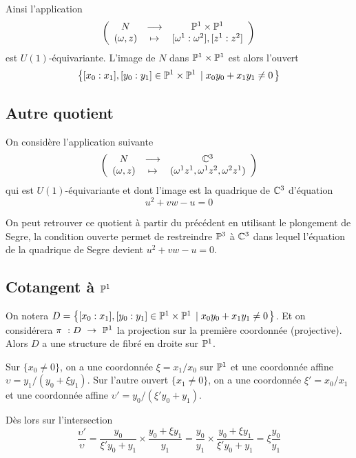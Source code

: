 \documentclass[a4paper,10pt]{article}
\begin{document}
Ainsi l'application
\[
\left(
\begin{array}{ccc}
N & \longrightarrow & \mathbb{P}^1 \times \mathbb{P}^1 \\ 
(\omega,z) & \mapsto & [\omega^1 : \omega^2],[z^1 : z^2]
\end{array} 
\right)
\]
est $U(1)$-équivariante. L'image de $N$ dans $\mathbb{P}^1 \times \mathbb{P}^1 $ est alors l'ouvert
\[
\left\lbrace {[x_0:x_1],[y_0:y_1]\in \mathbb{P}^1 \times \mathbb{P}^1  } \; \left| \; {x_0y_0 + x_1y_1 \neq 0} \right. \right\rbrace
\]
\subsection{Autre quotient}
On considère l'application suivante
\[
\left(
\begin{array}{ccc}
N & \longrightarrow & \mathbb{C}^3 \\ 
(\omega,z) & \mapsto & (\omega^1z^1, \omega^1z^2, \omega^2z^1)
\end{array} 
\right)
\]
qui est $U(1)$-équivariante et dont l'image est la quadrique de $\mathbb{C}^3$ d'équation
\[
u^2+vw-u = 0
\]

On peut retrouver ce quotient à partir du précédent en utilisant le plongement de Segre, la condition ouverte permet de restreindre $\mathbb{P}^3$ à $\mathbb{C}^3$ dans lequel l'équation de la quadrique de Segre devient $u^2+vw-u = 0$.

\subsection{Cotangent à $\mathbb{P}^1$}
On notera $D = \left\lbrace {[x_0:x_1],[y_0:y_1]\in \mathbb{P}^1 \times \mathbb{P}^1  } \; \left| \; {x_0y_0 + x_1y_1 \neq 0} \right. \right\rbrace$. Et on considérera $\pi~: D~\rightarrow~\mathbb{P}^1$ la projection sur la première coordonnée (projective). Alors $D$ a une structure de fibré en droite sur $\mathbb{P}^1$.

Sur $\{x_0 \neq 0\}$, on a une coordonnée $\xi = x_1/x_0$ sur $\mathbb{P}^1$ et une coordonnée affine $\upsilon = y_1 / (y_0+ \xi y_1)$. Sur l'autre ouvert $\{x_1 \neq 0\}$, on a une coordonnée $\xi' = x_0/x_1$ et une coordonnée affine $\upsilon' = y_0 / (\xi' y_0 +  y_1)$.

Dès lors sur l'intersection
\[
\dfrac{\upsilon'}{\upsilon} = \dfrac{y_0}{\xi' y_0 +  y_1} \times \dfrac{y_0 +  \xi y_1}{y_1} = \dfrac{y_0}{y_1} \times \dfrac{y_0 +  \xi y_1}{\xi' y_0 +  y_1} = \xi \dfrac{y_0}{y_1}
\]



\hline
\end{document}
